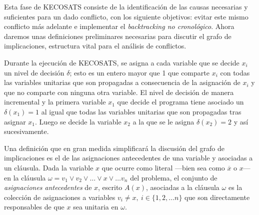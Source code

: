 \documentclass[12pt,lettersize,oneside]{article}
\begin{document}
Esta fase de KECOSATS consiste de la identificación de las causas necesarias y
suficientes para un dado conflicto, con los siguiente objetivos: evitar este
mismo conflicto más adelante e implementar el \emph{backtracking no
  cronológico}.  Ahora daremos unas definiciones preliminares necesarias para
discutir el grafo de implicaciones, estructura vital para el análisis de
conflictos.



Durante la ejecución de KECOSATS, se asigna a cada variable que se decide $x_i$
un nivel de decisión $\delta$; esto es un entero mayor que 1 que comparte $x_i$
con todas las variables unitarias que son propagadas a consecuencia de la
asignación de $x_i$ y que no comparte con ninguna otra variable. El nivel de
decisión de manera incremental y la primera variable $x_1$ que decide el
programa tiene asociado un $\delta(x_1) =1$ al igual que todas las variables
unitarias que son propagadas tras asignar $x_1$. Luego se decide la variable
$x_2$ a la que se le asigna $\delta(x_2)=2$ y así sucesivamente.

Una definición que en gran medida simplificará la discusión del grafo de
implicaciones es el de las asignaciones antecedentes de una variable y
asociadas a un cláusula. Dada la variable $x$ que ocurre como literal ---bien
sea como $\overline{x}$ o $x$--- en la cláusula $\omega = v_1 \vee v_2 \vee
\ldots \vee x \vee \ldots v_n$ del problema, el conjunto de \emph{asignaciones
  antecedentes} de $x$, escrito $A(x)$, asociadas a la cláusula $\omega$ es
la colección de asignaciones a variables $v_i \neq x,\ i \in \{1,2,\ldots n\}$
que son directamente responsables de que $x$ sea unitaria en $\omega$.
\end{document}
